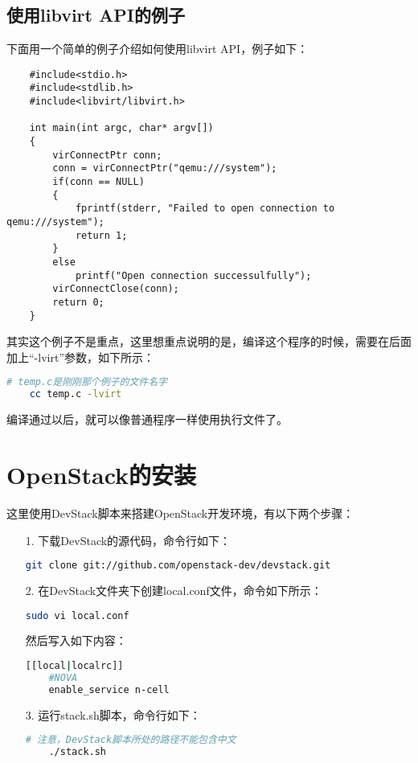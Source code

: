 \documentclass[a4paper,left=2.5cm,right=2.5cm,11pt]{article}
\begin{document}
\subsection{使用libvirt API的例子}
	下面用一个简单的例子介绍如何使用libvirt API，例子如下：
	\begin{lstlisting}
	#include<stdio.h>
	#include<stdlib.h>
	#include<libvirt/libvirt.h>

	int main(int argc, char* argv[])
	{
		virConnectPtr conn;
		conn = virConnectPtr("qemu:///system");
		if(conn == NULL)
		{
			fprintf(stderr, "Failed to open connection to qemu:///system");
			return 1;
		}
		else
			printf("Open connection successulfully");
		virConnectClose(conn);
		return 0;
	}
	\end{lstlisting}

	其实这个例子不是重点，这里想重点说明的是，编译这个程序的时候，需要在后面加上“-lvirt”参数，如下所示：
	\begin{lstlisting}[language = bash]
	# temp.c是刚刚那个例子的文件名字
	cc temp.c -lvirt
	\end{lstlisting}

	编译通过以后，就可以像普通程序一样使用执行文件了。

\clearpage

\section{OpenStack的安装}
	这里使用DevStack脚本来搭建OpenStack开发环境，有以下两个步骤：
	\begin{itemize}
		\item[1.] 下载DevStack的源代码，命令行如下：
		\begin{lstlisting}[language = bash]
	git clone git://github.com/openstack-dev/devstack.git
		\end{lstlisting}

		\item[2.] 在DevStack文件夹下创建local.conf文件，命令如下所示：
	\begin{lstlisting}[language = bash]
	sudo vi local.conf
	\end{lstlisting}

		然后写入如下内容：
		\begin{lstlisting}[language = bash]
	[[local|localrc]]
	#NOVA
	enable_service n-cell
		\end{lstlisting}

		\item[3.] 运行stack.sh脚本，命令行如下：
		\begin{lstlisting}[language = bash]
	# 注意，DevStack脚本所处的路径不能包含中文
	./stack.sh
		\end{lstlisting}
	\end{itemize}
\end{document}
